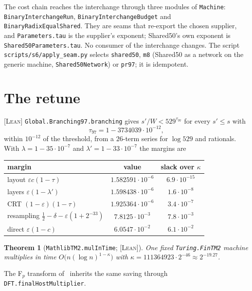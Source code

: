 \documentclass[11pt]{amsart}
\newtheorem{theorem}{Theorem}[section]
\theoremstyle{remark}
\newcommand{\lean}[1]{\texttt{#1}}
\newcommand{\tagL}{\textsc{[Lean]}}
\begin{document}
The cost chain reaches the interchange through three modules of \lean{Machine}:
\lean{BinaryInterchangeRun}, \lean{BinaryInterchangeBudget} and \lean{BinaryRadixEqualShared}. They are seams that
re-export the chosen supplier, and \lean{Parameters.tau} is the supplier's exponent; Shared50's
own exponent is \lean{Shared50Parameters.tau}. No consumer of the interchange changes. The script
\texttt{scripts/s6/apply\_seam.py} selects \texttt{shared50}, \texttt{m8} (Shared50 as a
network on the generic machine, \lean{Shared50Network}) or \texttt{pr97}; it is idempotent.

\section{The retune}\label{sec:retune}

\tagL{} \lean{Global.Branching97.branching} gives $s'/W < 529^{\tau_{97}}$ for every $s' \le s$
with
\[
  \tau_{97} = 1 - 3734039 \cdot 10^{-12},
\]
within $10^{-12}$ of the threshold, from a $26$-term series for $\log 529$ and rationals. With
$\lambda = 1 - 35 \cdot 10^{-7}$ and $\lambda' = 1 - 33 \cdot 10^{-7}$ the margins are
\begin{center}
\begin{tabular}{lcc}
\toprule
margin & value & slack over $\kappa$\\
\midrule
layout $\varepsilon c(1-\tau)$ & $1.582591 \cdot 10^{-6}$ & $6.9 \cdot 10^{-15}$\\
layers $\varepsilon(1-\lambda')$ & $1.598438 \cdot 10^{-6}$ & $1.6 \cdot 10^{-8}$\\
CRT $(1-\varepsilon)(1-\tau)$ & $1.925364 \cdot 10^{-6}$ & $3.4 \cdot 10^{-7}$\\
resampling $\tfrac12 - \delta - \varepsilon(1+2^{-33})$ & $7.8125 \cdot 10^{-3}$ &
$7.8 \cdot 10^{-3}$\\
direct $\varepsilon(1-c)$ & $6.0547 \cdot 10^{-2}$ & $6.1 \cdot 10^{-2}$\\
\bottomrule
\end{tabular}
\end{center}

\begin{theorem}[\lean{MathlibTM2.mulInTime}; \tagL]
One fixed \lean{Turing.FinTM2} machine multiplies in time $O\bigl(n (\log n)^{1-\kappa}\bigr)$
with $\kappa = 111364923 \cdot 2^{-46} \approx 2^{-19.27}$.
\end{theorem}

The F$_p$ transform of~\cite{DFT} inherits the same saving through
\lean{DFT.finalHostMultiplier}.
\end{document}
